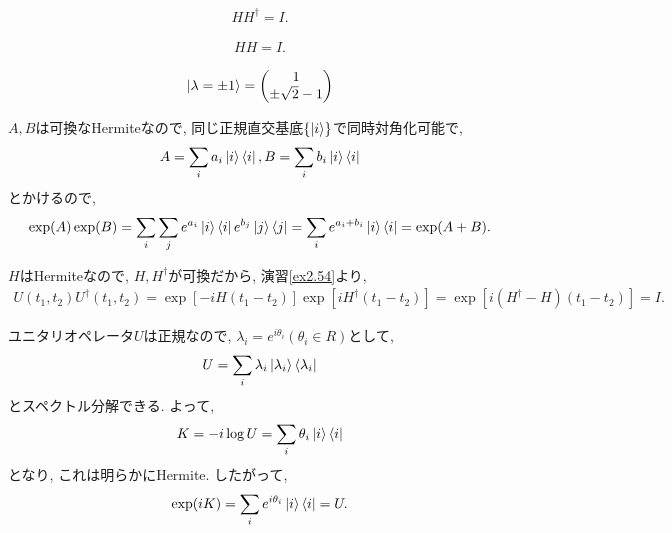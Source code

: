 \begin{ex}
    \label{ex2.51}
    \begin{align*}
        H H^\dagger = I.
    \end{align*}
\end{ex}

\begin{ex}
    \label{ex2.52}
    \begin{align*}
        H H = I.
    \end{align*}
\end{ex}

\begin{ex}
    \label{ex2.53}
    \begin{align*}
        \ket{\lambda = \pm 1}
        =
        \begin{pmatrix}
            1 \\ \pm \sqrt{2} - 1
        \end{pmatrix}
    \end{align*}
\end{ex}

\begin{ex}
    \label{ex2.54}
    $A,B$は可換なHermiteなので, 同じ正規直交基底$\{ \ket{i}\}$で同時対角化可能で,
    \begin{align*}
        A = \sum_i a_i \ket{i} \bra{i},
        B = \sum_i b_i \ket{i} \bra{i}
    \end{align*}
    とかけるので,
    \begin{align*}
        \exp(A) \exp(B)
        =
        \sum_i \sum_j e^{a_i} \ket{i} \bra{i}
        e^{b_j} \ket{j} \bra{j}
        =
        \sum_i e^{a_i+b_i} \ket{i} \bra{i}
        =
        \exp(A+B).
    \end{align*}
\end{ex}

\begin{ex}
    \label{ex2.55}
    $H$はHermiteなので, $H,H^\dagger$が可換だから,
    演習\ref{ex2.54}より,
    \begin{align*}
        U(t_1,t_2)U^\dagger(t_1,t_2)
        =
        \exp{\left[ - iH(t_1 - t_2)\right]}
        \exp{\left[ iH^\dagger(t_1 - t_2)\right]}
        =
        \exp{\left[ i(H^\dagger - H)(t_1 - t_2)\right]}
        =
        I.
    \end{align*}
\end{ex}

\begin{ex}
    \label{ex2.56}
    ユニタリオペレータ$U$は正規なので, $\lambda_i=e^{i\theta_i} (\theta_i \in R)$として,
    \begin{align*}
        U = \sum_i \lambda_i \ket{\lambda_i} \bra{\lambda_i}
    \end{align*}
    とスペクトル分解できる. よって,
    \begin{align*}
        K = - i \log{U} = \sum_i \theta_i \ket{i} \bra{i}
    \end{align*}
    となり, これは明らかにHermite. したがって,
    \begin{align*}
        \exp(iK) = \sum_i e^{i\theta_i} \ket{i} \bra{i} = U.
    \end{align*}
\end{ex}

